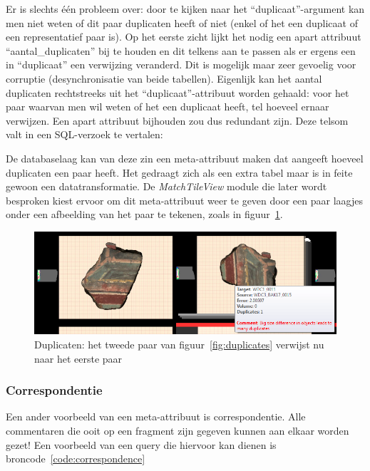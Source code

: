 Er is slechts \'e\'en probleem over: door te kijken naar het ``duplicaat''-argument kan men niet weten of dit paar duplicaten heeft of niet (enkel of het een duplicaat of een representatief paar is). Op het eerste zicht lijkt het nodig een apart attribuut ``aantal\_duplicaten'' bij te houden en dit telkens aan te passen als er ergens een in ``duplicaat'' een verwijzing veranderd. Dit is mogelijk maar zeer gevoelig voor corruptie (desynchronisatie van beide tabellen). Eigenlijk kan het aantal duplicaten rechtstreeks uit het ``duplicaat''-attribuut worden gehaald: voor het paar waarvan men wil weten of het een duplicaat heeft, tel hoeveel ernaar verwijzen. Een apart attribuut bijhouden zou dus redundant zijn. Deze telsom valt in een SQL-verzoek te vertalen:



De databaselaag kan van deze zin een meta-attribuut maken dat aangeeft hoeveel duplicaten een paar heeft. Het gedraagt zich als een extra tabel maar is in feite gewoon een datatransformatie. De \emph{MatchTileView} module die later wordt besproken kiest ervoor om dit meta-attribuut weer te geven door een paar laagjes onder een afbeelding van het paar te tekenen, zoals in figuur~\ref{fig:duplicatesdone}.

\begin{figure}[!h]
	\begin{center}
		\includegraphics[width=1.0\columnwidth]{images/duplicates-2.png}
		\caption{Duplicaten: het tweede paar van figuur~\ref{fig:duplicates} verwijst nu naar het eerste paar}
		\label{fig:duplicatesdone}
	\end{center}
\end{figure}

\subsubsection{Correspondentie}
Een ander voorbeeld van een meta-attribuut is correspondentie. Alle commentaren die ooit op een fragment zijn gegeven kunnen aan elkaar worden gezet! Een voorbeeld van een query die hiervoor kan dienen is broncode~\ref{code:correspondence}\\

